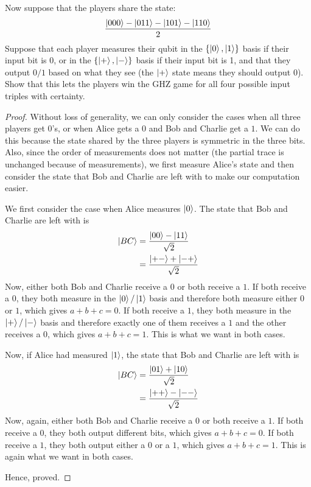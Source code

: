 \begin{solution}[label=ques:3b]
  \begin{question}
    Now suppose that the players share the state:
\[
\frac{\ket{000} - \ket{011} - \ket{101} - \ket{110}}{2}
\]
Suppose that each player measures their qubit in the $\{\ket{0}, \ket{1}\}$ basis if their input bit is 0, or in the $\{\ket{+}, \ket{-}\}$ basis if their input bit is 1, and that they output $0/1$ based on what they see (the $\ket{+}$ state means they should output $0$). Show that this lets the players win the GHZ game for all four possible input triples with certainty.
  \end{question}
  \tcblower{}
  \begin{proof}
    Without loss of generality, we can only consider the cases when all three players get $0$'s, or when Alice gets a $0$ and Bob and Charlie get a $1$. We can do this because the state shared by the three players is symmetric in the three bits. Also, since the order of measurements does not matter (the partial trace is unchanged because of measurements), we first measure Alice's state and then consider the state that Bob and Charlie are left with to make our computation easier.\par
    We first consider the case when Alice measures $\ket{0}$. The state that Bob and Charlie are left with is
    \begin{equation}
      \begin{split}
        \ket{BC} &= \frac{\ket{00} - \ket{11}}{\sqrt{2}}\\
        &= \frac{\ket{+-} + \ket{-+}}{\sqrt{2}}
      \end{split}
      \label{eq:ghz0}
    \end{equation}
    Now, either both Bob and Charlie receive a $0$ or both receive a $1$. If both receive a $0$, they both measure in the $\ket{0}/\ket{1}$ basis and therefore both measure either $0$ or $1$, which gives $a + b + c = 0$. If both receive a $1$, they both measure in the $\ket{+}/\ket{-}$ basis and therefore exactly one of them receives a $1$ and the other receives a $0$, which gives $a + b + c = 1$. This is what we want in both cases.\par
    Now, if Alice had measured $\ket{1}$, the state that Bob and Charlie are left with is
    \begin{equation}
      \begin{split}
        \ket{BC} &= \frac{\ket{01} + \ket{10}}{\sqrt{2}}\\
        &= \frac{\ket{++} - \ket{--}}{\sqrt{2}}
      \end{split}
      \label{eq:ghz1}
    \end{equation}
    Now, again, either both Bob and Charlie receive a $0$ or both receive a $1$. If both receive a $0$, they both output different bits, which gives $a + b + c = 0$. If both receive a $1$, they both output either a $0$ or a $1$, which gives $a + b + c = 1$. This is again what we want in both cases.\par
    Hence, proved.
  \end{proof}
\end{solution}

